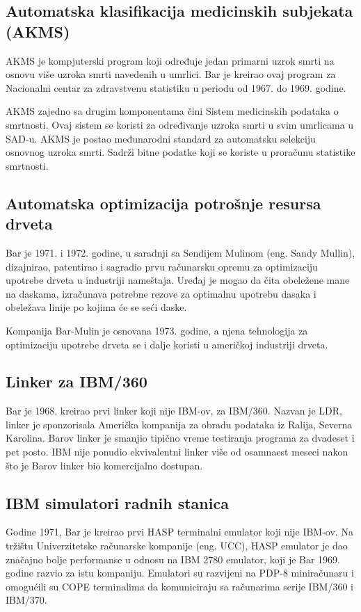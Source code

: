 \documentclass[a4paper]{article}
\begin{document}
{		\subsection{Automatska klasifikacija medicinskih subjekata (AKMS)}
		AKMS je kompjuterski program koji određuje jedan primarni uzrok smrti na osnovu više uzroka smrti navedenih u umrlici. Bar je kreirao ovaj program za Nacionalni centar za zdravstvenu statistiku u periodu od 1967. do 1969. godine.
		
		AKMS zajedno sa drugim komponentama čini Sistem medicinskih podataka o smrtnosti. Ovaj sistem se koristi za određivanje uzroka smrti u svim umrlicama u SAD-u. AKMS je postao međunarodni standard za automatsku selekciju osnovnog uzroka smrti. Sadrži bitne podatke koji se koriste u proračunu statistike smrtnosti.
		
		\subsection{Automatska optimizacija potrošnje resursa drveta}
		Bar je 1971. i 1972. godine, u saradnji sa Sendijem Mulinom (eng. Sandy Mullin), dizajnirao, patentirao i sagradio prvu računarsku opremu za optimizaciju upotrebe drveta u industriji nameštaja. Uređaj je mogao da čita obeležene mane na daskama, izračunava potrebne rezove za optimalnu upotrebu dasaka i obeležava linije po kojima će se seći daske.\cite{helmers}
		
		Kompanija Bar-Mulin je osnovana 1973. godine, a njena tehnologija za optimizaciju upotrebe drveta se i dalje koristi u američkoj industriji drveta.\cite{cox} 
		
		\subsection{Linker za IBM/360}
		Bar je 1968. kreirao prvi linker koji nije IBM-ov, za IBM/360. Nazvan je LDR, linker je sponzorisala Američka kompanija za obradu podataka iz Ralija, Severna Karolina. Barov linker je smanjio tipično vreme testiranja programa za dvadeset i pet posto.\cite{linker} \cite{ibm} IBM nije ponudio ekvivalentni linker više od osamnaest meseci nakon što je Barov linker bio komercijalno dostupan.
		
		\subsection{IBM simulatori radnih stanica}
		Godine 1971, Bar je kreirao prvi HASP terminalni emulator koji nije IBM-ov. Na tržištu Univerzitetske računarske kompanije (eng. UCC), HASP emulator je dao značajno bolje performanse u odnosu na IBM 2780 emulator, koji je Bar 1969. godine razvio za istu kompaniju. Emulatori su razvijeni na PDP-8 miniračunaru i omogućili su COPE terminalima da komuniciraju sa računarima serije IBM/360 i IBM/370.
		
}
\end{document}
